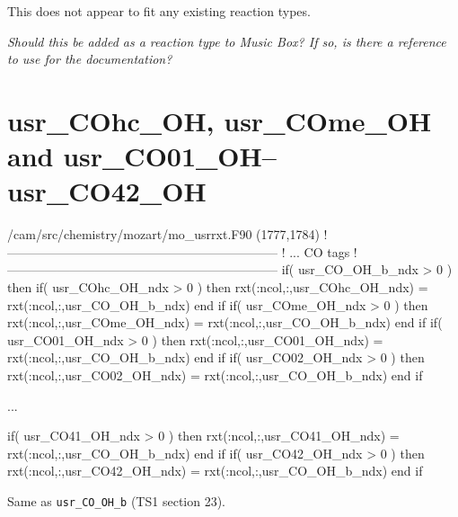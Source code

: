 \documentclass[titlepage]{article}
\begin{document}
This does not appear to fit any existing reaction types.

\vspace{20px}
\textit{\Large Should this be added as a reaction type to Music Box? If so, is there a reference to use for the documentation?}



\section{usr\_COhc\_OH, usr\_COme\_OH and usr\_CO01\_OH--usr\_CO42\_OH}

\begin{blockcode}[commandchars=\\\{\}]
\color{gray}/cam/src/chemistry/mozart/mo_usrrxt.F90 (1777,1784)
!-----------------------------------------------------------------
!      ... CO tags
!-----------------------------------------------------------------
      if( usr_CO_OH_b_ndx > 0 ) then
         if( usr_COhc_OH_ndx > 0 ) then
            rxt(:ncol,:,usr_COhc_OH_ndx) = rxt(:ncol,:,usr_CO_OH_b_ndx)
         end if
         if( usr_COme_OH_ndx > 0 ) then
            rxt(:ncol,:,usr_COme_OH_ndx) = rxt(:ncol,:,usr_CO_OH_b_ndx)
         end if
         if( usr_CO01_OH_ndx > 0 ) then
            rxt(:ncol,:,usr_CO01_OH_ndx) = rxt(:ncol,:,usr_CO_OH_b_ndx)
         end if
         if( usr_CO02_OH_ndx > 0 ) then
            rxt(:ncol,:,usr_CO02_OH_ndx) = rxt(:ncol,:,usr_CO_OH_b_ndx)
         end if

         {\color{black}...}

         if( usr_CO41_OH_ndx > 0 ) then
            rxt(:ncol,:,usr_CO41_OH_ndx) = rxt(:ncol,:,usr_CO_OH_b_ndx)
         end if
         if( usr_CO42_OH_ndx > 0 ) then
            rxt(:ncol,:,usr_CO42_OH_ndx) = rxt(:ncol,:,usr_CO_OH_b_ndx)
         end if
\end{blockcode}

Same as \verb>usr_CO_OH_b> (TS1 section 23).

\end{document}
